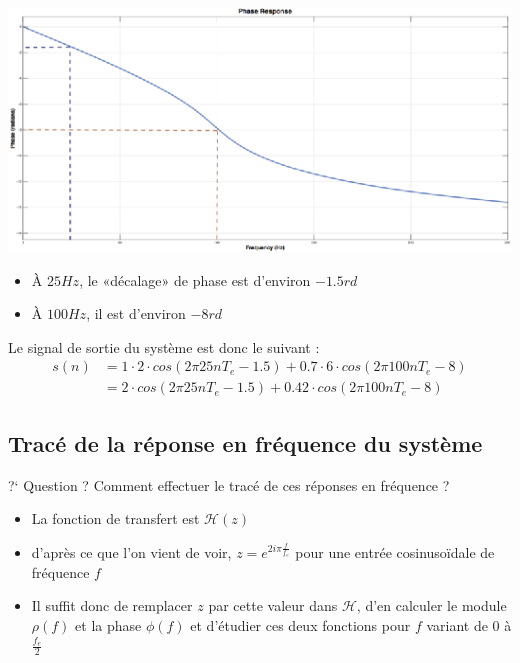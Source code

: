 \documentclass[a4paper,11pt]{beamer}
\begin{document}
\begin{frame}
\centering
\includegraphics[scale=1.5]{images/PhaseFilter3_BIS.eps}
\begin{itemize}[label=$\bullet$]
  \item À $25Hz$, le «décalage» de phase est d'environ $-1.5rd$
  \item À $100Hz$, il est d'environ $-8rd$
\end{itemize}
\end{frame}

\begin{frame}
\centering
Le signal de sortie du système est donc le suivant :
$$
\begin{aligned}
s(n) &= 1\cdot 2\cdot cos(2\pi 25 nT_e - 1.5) + 0.7\cdot 6\cdot cos(2\pi 100
nT_e - 8) \\
    &= 2\cdot cos(2\pi 25 nT_e - 1.5) + 0.42\cdot cos(2\pi 100nT_e - 8)
\end{aligned}
$$
\end{frame}

\subsection{Tracé de la réponse en fréquence du système}
\begin{frame}
\begin{exampleblock}{?` Question ?}
\centering
Comment effectuer le tracé de ces réponses en fréquence ?
\end{exampleblock}
\pause
\begin{itemize}[label=$\bullet$]
  \justifying
  \item La fonction de transfert est $\mathcal{H}(z)$\pause
  \item d'après ce que l'on vient de voir, $z=e^{2i\pi\frac{f}{f_e}}$ pour une
  entrée cosinusoïdale de fréquence $f$\pause
  \item Il suffit donc de remplacer $z$ par cette valeur dans $\mathcal{H}$,
  d'en calculer le module $\rho(f)$ et la phase $\phi(f)$ et
  d'étudier ces deux fonctions pour $f$ variant de $0$ à $\frac{f_e}{2}$
\end{itemize}
\end{frame}
\end{document}
